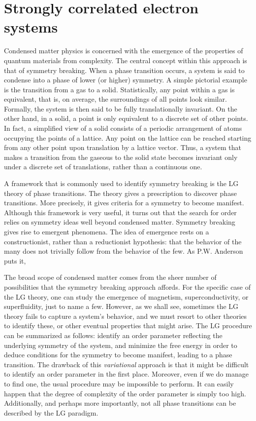 \section{Strongly correlated electron systems}
\label{sec:strongly_correlated}

Condensed matter physics is concerned with the emergence of the properties of quantum materials from complexity.
The central concept within this approach is that of symmetry breaking.
When a phase transition occurs, a system is said to condense into a phase of lower (or higher) symmetry.
A simple pictorial example is the transition from a gas to a solid.
Statistically, any point within a gas is equivalent, that is, on average, the surroundings of all points look similar.
Formally, the system is then said to be fully translationally invariant.
On the other hand, in a solid, a point is only equivalent to a discrete set of other points.
In fact, a simplified view of a solid consists of a periodic arrangement of atoms occupying the points of a lattice.
Any point on the lattice can be reached starting from any other point upon translation by a lattice vector.
Thus, a system that makes a transition from the gaseous to the solid state becomes invariant only under a discrete set of translations, rather than a continuous one. 

A framework that is commonly used to identify symmetry breaking is the \ac{LG} theory of phase transitions.
The theory gives a prescription to discover phase transitions.
More precisely, it gives criteria for a symmetry to become manifest.
Although this framework is very useful, it turns out that the search for order relies on symmetry ideas well beyond condensed matter.
Symmetry breaking gives rise to emergent phenomena.
The idea of emergence rests on a constructionist, rather than a reductionist hypothesis: that the behavior of the many does not trivially follow from the behavior of the few.
As P.W. Anderson puts it,  \cite{anderson_more_1972}

The broad scope of condensed matter comes from the sheer number of possibilities that the symmetry breaking approach affords.
For the specific case of the \acs{LG} theory, one can study the emergence of magnetism, superconductivity, or superfluidity, just to name a few.
However, as we shall see, sometimes the \acs{LG} theory fails to capture a system's behavior, and we must resort to other theories to identify these, or other eventual properties that might arise.
The \acl{LG} procedure can be summarized as follows: identify an order parameter reflecting the underlying symmetry of the system, and minimize the free energy in order to deduce conditions for the symmetry to become manifest, leading to a phase transition.
The drawback of this \emph{variational} approach is that it might be difficult to identify an order parameter in the first place.
Moreover, even if we do manage to find one, the usual procedure may be impossible to perform.
It can easily happen that the degree of complexity of the order parameter is simply too high.
Additionally, and perhaps more importantly, not all phase transitions can be described by the LG paradigm.

